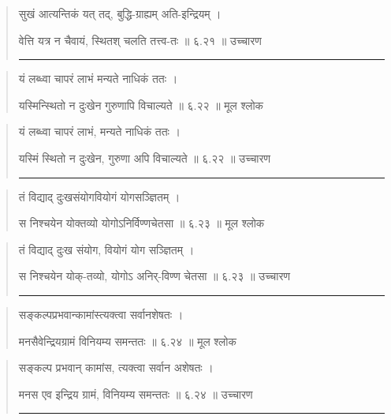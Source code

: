 \begin{quotation}

सुखं आत्यन्तिकं यत् तद्‍, बुद्धि-ग्राह्यम् अति-इन्द्रियम्‌  ।  

वेत्ति यत्र न चैवायं, स्थितश् चलति तत्त्व-तः  ॥ ६.२१ ॥  उच्चारण

\noindent\rule{16cm}{0.4pt} 
\end{quotation}


\begin{quotation}  

यं लब्ध्वा चापरं लाभं मन्यते नाधिकं ततः  ।  

यस्मिन्स्थितो न दुःखेन गुरुणापि विचाल्यते  ॥ ६.२२ ॥  मूल श्लोक
\end{quotation}

\begin{quotation}

यं लब्ध्वा चापरं लाभं, मन्यते नाधिकं ततः  ।  

यस्मिं स्थितो न दुःखेन, गुरुणा अपि विचाल्यते  ॥ ६.२२ ॥  उच्चारण

\noindent\rule{16cm}{0.4pt} 
\end{quotation}


\begin{quotation}  

तं विद्याद् दुःखसंयोगवियोगं योगसञ्ज्ञितम् ।  

स निश्चयेन योक्तव्यो योगोऽनिर्विण्णचेतसा  ॥ ६.२३ ॥  मूल श्लोक
\end{quotation}

\begin{quotation}

तं विद्याद् दुःख संयोग, वियोगं योग सञ्ज्ञितम् ।  

स निश्चयेन योक्-तव्यो, योगोऽ अनिर्-विण्ण चेतसा  ॥ ६.२३ ॥  उच्चारण

\noindent\rule{16cm}{0.4pt} 
\end{quotation}


\begin{quotation}  
सङ्‍कल्पप्रभवान्कामांस्त्यक्त्वा सर्वानशेषतः  ।  

मनसैवेन्द्रियग्रामं विनियम्य समन्ततः  ॥ ६.२४ ॥  मूल श्लोक
\end{quotation}

\begin{quotation}

सङ्‍कल्प प्रभवान् कामांस, त्यक्त्वा सर्वान अशेषतः  ।  

मनस एव इन्द्रिय ग्रामं, विनियम्य समन्ततः  ॥ ६.२४ ॥  उच्चारण

\noindent\rule{16cm}{0.4pt} 
\end{quotation}


